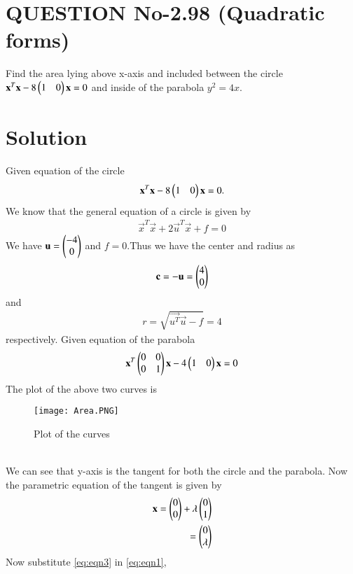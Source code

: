 \documentclass[journal,12pt,twocolumn]{IEEEtran}
\begin{document}
\section{QUESTION No-2.98 (Quadratic forms)}
\item Find the area lying above x-axis and included between the circle $\mathbf{x}^T\mathbf{x}-8\begin{pmatrix}1 & 0\end{pmatrix}\mathbf{x}=0$  and inside of the parabola $y^2 = 4x$.
%

%
\section{Solution}
Given equation of the circle 
\begin{align}
 \mathbf{x}^T\mathbf{x}-8\begin{pmatrix}1 & 0\end{pmatrix}\mathbf{x}=0.\label{eq:eqn1}  
\end{align}
We know that the general equation of a circle is given by
\begin{align}
  \vec{x}^T\vec{x}+2\vec{u}^T\vec{x}+f=0  
\end{align}
We have $\mathbf{u} = \begin{pmatrix}-4 \\ 0\end{pmatrix}$ and $f = 0$.Thus we have the center and radius as 
\begin{align}
\mathbf{c} = -\mathbf{u} = \begin{pmatrix}4 \\ 0\end{pmatrix}
\end{align} and 
\begin{align}
r= \sqrt{\vec{u^T}\vec{u} - f} = 4
\end{align} respectively.
Given equation of the parabola 
\begin{align}
 \mathbf{x}^T\begin{pmatrix}0&0 \\ 0&1\end{pmatrix}\mathbf{x}-4\begin{pmatrix}1&0\end{pmatrix}\mathbf{x}=0 \label{eq:eqn2}  
\end{align}
The plot of the above two curves is
\begin{figure}[ht]
\centering
\texttt{[image: Area.PNG]}
\caption{Plot of the curves}
\label{Plot of the curves}
\end{figure}
\\
We can see that y-axis is the tangent for both the circle and the parabola.
Now the parametric equation of the tangent is given by
\begin{align}
    \mathbf{x}= \begin{pmatrix}0 \\ 0\end{pmatrix} +\lambda\begin{pmatrix}0 \\ 1\end{pmatrix} 
    \\
    = \begin{pmatrix}0 \\ \lambda\end{pmatrix} \label{eq:eqn3}
\end{align}
Now substitute \eqref{eq:eqn3} in \eqref{eq:eqn1},
\end{document}

